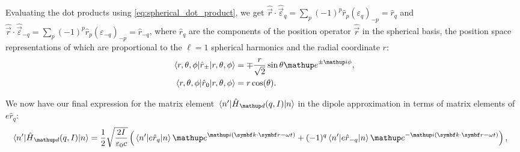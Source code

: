 Evaluating the dot products using \eqref{eq:spherical_dot_product}, we get $\hat{\vec r}\cdot \hat{\vec\varepsilon}_q = \sum_p (-1)^p \hat r_p (\varepsilon_q)_{-p} = \hat r_q$ and $\hat{\vec r}\cdot \hat{\vec\varepsilon}_{-q} = \sum_p (-1)^p \hat r_p (\varepsilon_{-q})_{-p} = \hat r_{-q}$, where $\hat r_q$ are the components of the position operator $\hat{\vec r}$ in the spherical basis, the position space representations of which are proportional to the $\ell=1$ spherical harmonics and the radial coordinate $r$:
\begin{align}
\matrixel{r, \theta, \phi}{\hat r_\pm}{r, \theta, \phi}
    &= \mp\frac r {\sqrt2}\sin\theta\ee^{\pm\ii\phi},\\
\matrixel{r, \theta, \phi}{\hat r_0}{r, \theta, \phi} &= r\cos(\theta).
\end{align}

We now have our final expression for the matrix element $\matrixel{n^\prime}{\hat H_\up{d}(q,I)}{n}$ in the dipole approximation in terms of matrix elements of $e\hat r_q$:
\begin{align}\label{eq:diple_matrixel_withminus}
\matrixel{n^\prime}{\hat H_\up{d}(q,I)}{n} &= 
\frac12\sqrt{\frac{2I}{\varepsilon_0 c}}\left(
\matrixel{n^\prime}
  {e\hat r_q}
  {n}\ee^{\ii(\vec k \cdot \vec r - \omega t)}
+(-1)^q
\matrixel{n^\prime}
  {e\hat r_{-q}}
  {n} \ee^{-\ii(\vec k \cdot \vec r - \omega t)}\right),
\end{align}

